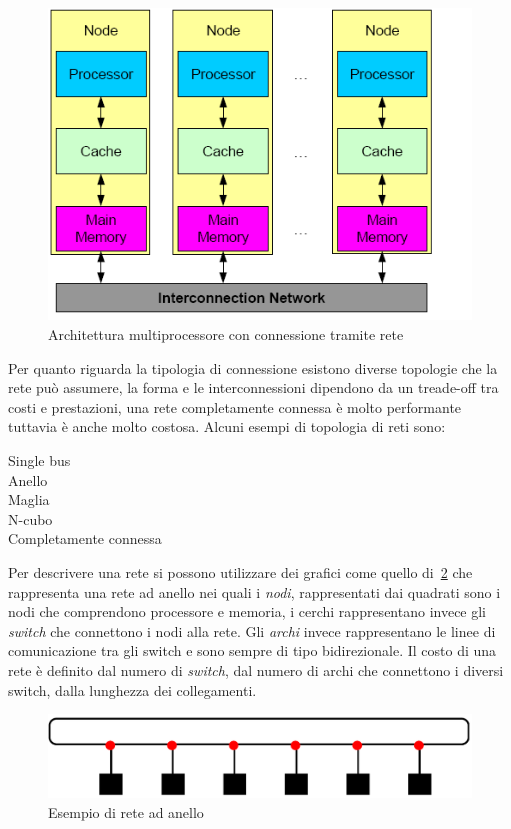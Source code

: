 \begin{figure}[htb]
\centering
\includegraphics[scale=0.5]{img/multinetwork.png}
\caption{Architettura multiprocessore con connessione tramite rete}\label{fig:multinetwork}
\end{figure}
Per quanto riguarda la tipologia di connessione esistono diverse topologie che la rete può assumere, la forma e le interconnessioni dipendono da un treade-off tra costi e prestazioni, una rete completamente connessa è molto performante tuttavia è anche molto costosa. Alcuni esempi di topologia di reti sono:
\begin{description}
\item[Single bus]
\item[Anello]
\item[Maglia]
\item[N-cubo]
\item[Completamente connessa]
\end{description}
Per descrivere una rete si possono utilizzare dei grafici come quello di \figurename\,\ref{fig:networking} che rappresenta una rete ad anello nei quali i \emph{nodi}, rappresentati dai quadrati sono i nodi che comprendono processore e memoria, i cerchi rappresentano invece gli \emph{switch} che connettono i nodi alla rete. Gli \emph{archi} invece rappresentano le linee di comunicazione tra gli switch e sono sempre di tipo bidirezionale. Il costo di una rete è definito dal numero di \emph{switch}, dal numero di archi che connettono i diversi switch, dalla lunghezza dei collegamenti.\\
\begin{figure}[htb]
\centering
\includegraphics[scale=0.5]{img/networking.png}
\caption{Esempio di rete ad anello}\label{fig:networking}
\end{figure}
